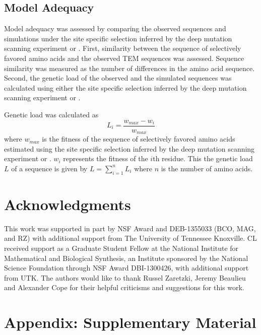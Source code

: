 \subsection{Model Adequacy}

Model adequacy was assessed by comparing the observed sequences and simulations under the site specific selection inferred by the deep mutation scanning experiment or \selac.
First, similarity between the sequence of selectively favored amino acids and the observed TEM sequences was assessed.
Sequence similarity was measured as the number of differences in the amino acid sequence.
Second, the genetic load of the observed and the simulated sequences was calculated using either the site specific selection inferred by the deep mutation scanning experiment or \selac.

Genetic load was calculated as
\begin{equation}
L_i = \frac{w_{max} - w_i}{w_{max}}
\end{equation}
where $w_{max}$ is the fitness of the sequence of selectively favored amino acids estimated using  the site specific selection inferred by the deep mutation scanning experiment or \selac.
$w_i$ represents the fitness of the $i$th residue.
This the genetic load $L$ of a sequence is given by $L = \sum_{i=1}^n L_i$ where $n$ is the number of amino acids.

\section{Acknowledgments}

This work was supported in part by NSF Award and DEB-1355033 (BCO, MAG, and RZ) with additional support from The University of Tennessee Knoxville. 
CL received support as a Graduate Student Fellow at the National Institute for Mathematical and Biological Synthesis, an Institute sponsored by the National Science Foundation through NSF Award DBI-1300426, with additional support from UTK. 
The authors would like to thank Russel Zaretzki, Jeremy Beaulieu and Alexander Cope for their helpful criticisms and suggestions for this work.




%
%

\clearpage
\section{Appendix: Supplementary Material}

